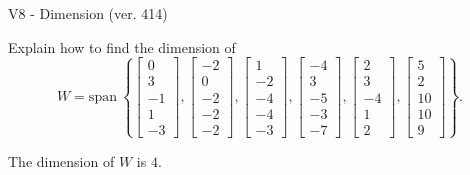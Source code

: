 \begin{exercise}
  \begin{exerciseTitle}V8 - Dimension (ver. 414)\end{exerciseTitle}
  \begin{exerciseStatement}
    Explain how to find the dimension of 
\[W=\mathrm{span}\ \left\{\left[\begin{array}{r}
0 \\
3 \\
-1 \\
1 \\
-3
\end{array}\right] , \left[\begin{array}{r}
-2 \\
0 \\
-2 \\
-2 \\
-2
\end{array}\right] , \left[\begin{array}{r}
1 \\
-2 \\
-4 \\
-4 \\
-3
\end{array}\right] , \left[\begin{array}{r}
-4 \\
3 \\
-5 \\
-3 \\
-7
\end{array}\right] , \left[\begin{array}{r}
2 \\
3 \\
-4 \\
1 \\
2
\end{array}\right] , \left[\begin{array}{r}
5 \\
2 \\
10 \\
10 \\
9
\end{array}\right]\right\}.\]



  \end{exerciseStatement}
  \begin{exerciseAnswer}
   The dimension of \(W\) is  \(4\).
  


  \end{exerciseAnswer}
\end{exercise}